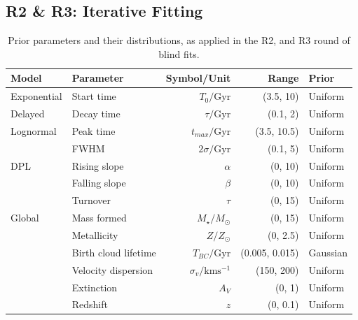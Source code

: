 \documentclass[a4paper,11pt]{article}
\begin{document}
\subsection{R2 \& R3: Iterative Fitting}\label{sec:r2_and_r3}

\begin{table}[h]
  \centering
  \begin{tabular}{l l r r l}
    Model       & Parameter            & Symbol/Unit                  & Range          & Prior    \\
    \hline \hline
    Exponential & Start time           & $T_0/\mathrm{Gyr}$           & (3.5, 10)      & Uniform  \\
    Delayed     & Decay time           & $\tau/\mathrm{Gyr}$          & (0.1, 2)       & Uniform  \\
    \hline
    Lognormal   & Peak time            & $t_{max}/\mathrm{Gyr}$       & (3.5, 10.5)    & Uniform  \\
                & FWHM                 & $2\sigma/\mathrm{Gyr}$       & (0.1, 5)       & Uniform  \\
    \hline
    DPL         & Rising slope         & $\alpha$                     & (0, 10)        & Uniform  \\
                & Falling slope        & $\beta$                      & (0, 10)        & Uniform  \\
                & Turnover             & $\tau$                       & (0, 15)        & Uniform  \\
    \hline
    Global      & Mass formed          & $M_\star/M_\odot$            & (0, 15)        & Uniform  \\
                & Metallicity          & $Z/Z_\odot$                  & (0, 2.5)       & Uniform  \\
                & Birth cloud lifetime & $T_{BC}/\mathrm{Gyr}$        & (0.005, 0.015) & Gaussian \\
                & Velocity dispersion  & $\sigma_v/\mathrm{kms^{-1}}$ & (150, 200)     & Uniform  \\
                & Extinction           & $A_V$                        & (0, 1)         & Uniform  \\
                & Redshift             & $z$                          & (0, 0.1)       & Uniform  \\
    \hline
  \end{tabular}
  \caption{Prior parameters and their distributions, as applied in the R2, and R3 round of blind fits.}
  \label{tab:r2_r3_priors}
\end{table}
\end{document}
